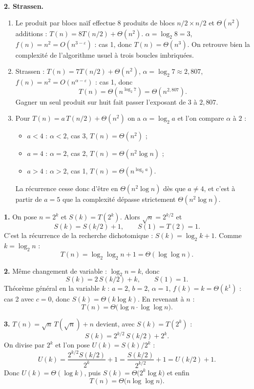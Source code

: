 \documentclass[11pt,a4paper]{article}
\begin{document}
\textbf{2. Strassen.}
\begin{enumerate}[label=(\alph*),leftmargin=*,itemsep=4pt]
  \item Le produit par blocs naïf effectue $8$ produits de blocs $n/2\times n/2$ et
        $\Theta(n^2)$ additions : $T(n)=8T(n/2)+\Theta(n^{2})$.
        $\alpha=\log_2 8 = 3$, $f(n)=n^{2}=O(n^{3-\varepsilon})$ : cas 1, donc
        $T(n)=\Theta(n^{3})$. On retrouve bien la complexité de l'algorithme usuel
        à trois boucles imbriquées.
  \item Strassen : $T(n)=7T(n/2)+\Theta(n^{2})$, $\alpha=\log_2 7\approx2{,}807$,
        $f(n)=n^2=O(n^{\alpha-\varepsilon})$ : cas 1, donc
        \[
          \boxed{T(n)=\Theta\!\left(n^{\log_2 7}\right)=\Theta\!\left(n^{2{,}807}\right)}.
        \]
        Gagner un seul produit sur huit fait passer l'exposant de $3$ à $2{,}807$.
  \item Pour $T(n)=a\,T(n/2)+\Theta(n^{2})$ on a $\alpha=\log_2 a$ et l'on compare
        $\alpha$ à $2$ :
        \begin{itemize}[leftmargin=*,itemsep=1pt]
          \item $a<4$ : $\alpha<2$, cas 3, $T(n)=\Theta(n^{2})$ ;
          \item $a=4$ : $\alpha=2$, cas 2, $T(n)=\Theta(n^{2}\log n)$ ;
          \item $a>4$ : $\alpha>2$, cas 1, $T(n)=\Theta(n^{\log_2 a})$.
        \end{itemize}
        La récurrence cesse donc d'être en $\Theta(n^{2}\log n)$ dès que $a\ne4$, et
        c'est à partir de $a=5$ que la complexité dépasse strictement
        $\Theta(n^{2}\log n)$.
\end{enumerate}

\reponse
\textbf{1.} On pose $n=2^{k}$ et $S(k)=T(2^{k})$. Alors $\sqrt n = 2^{k/2}$ et
\[
  S(k)=S(k/2)+1,\qquad S(1)=T(2)=1 .
\]
C'est la récurrence de la recherche dichotomique : $S(k)=\log_2 k+1$.
Comme $k=\log_2 n$ :
\[
  T(n) = \log_2\log_2 n + 1 = \Theta(\log\log n).
\]

\textbf{2.} Même changement de variable : $\log_2 n = k$, donc
\[
  S(k)=2\,S(k/2)+k,\qquad S(1)=1 .
\]
Théorème général en la variable $k$ : $a=2$, $b=2$, $\alpha=1$, $f(k)=k=\Theta(k^{1})$ :
cas 2 avec $c=0$, donc $S(k)=\Theta(k\log k)$. En revenant à $n$ :
\[
  \boxed{T(n)=\Theta\!\big(\log n \cdot \log\log n\big)} .
\]

\textbf{3.} $T(n)=\sqrt n\,T(\sqrt n)+n$ devient, avec $S(k)=T(2^{k})$ :
\[
  S(k) = 2^{k/2}\,S(k/2) + 2^{k}.
\]
On divise par $2^{k}$ et l'on pose $U(k)=S(k)/2^{k}$ :
\[
  U(k) = \frac{2^{k/2}S(k/2)}{2^{k}} + 1 = \frac{S(k/2)}{2^{k/2}} + 1 = U(k/2)+1 .
\]
Donc $U(k)=\Theta(\log k)$, puis $S(k)=\Theta\!\big(2^{k}\log k\big)$ et enfin
\[
  \boxed{T(n)=\Theta\!\big(n\log\log n\big)} .
\]
\end{document}
